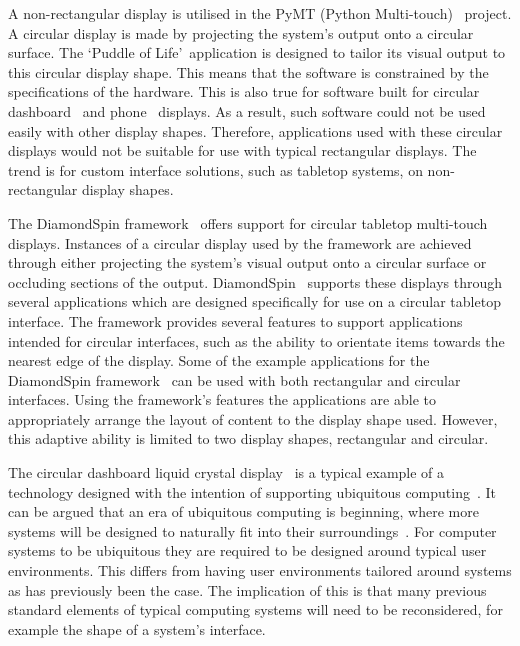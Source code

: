 \documentclass[review,5p,times,twocolumn]{elsarticle}
\begin{document}
A non-rectangular display is utilised in the PyMT (Python Multi-touch)~\cite{Hansen2009} project.
A circular display is made by projecting the system's output onto a circular surface.
The \lq Puddle of Life\rq\ application is designed to tailor its visual output to this circular display shape.
This means that the software is constrained by the specifications of the hardware.
This is also true for software built for circular dashboard~\cite{Boyd2007} and phone~\cite{Finney2009} displays.
As a result, such software could not be used easily with other display shapes.
Therefore, applications used with these circular displays would not be suitable for use with typical rectangular displays.
The trend is for custom interface solutions, such as tabletop systems, on non-rectangular display shapes.

The DiamondSpin framework~\cite{Shen2004} offers support for circular tabletop multi-touch displays.
Instances of a circular display used by the framework are achieved through either projecting the system's visual output onto a circular surface or occluding sections of the output.
DiamondSpin~\cite{Shen2004} supports these displays through several applications which are designed specifically for use on a circular tabletop interface.
The framework provides several features to support applications intended for circular interfaces, such as the ability to orientate items towards the nearest edge of the display.
Some of the example applications for the DiamondSpin framework~\cite{Shen2004} can be used with both rectangular and circular interfaces.
Using the framework's features the applications are able to appropriately arrange the layout of content to the display shape used.
However, this adaptive ability is limited to two display shapes, rectangular and circular.

The circular dashboard liquid crystal display~\cite{Boyd2007} is a typical example of a technology designed with the intention of supporting ubiquitous computing~\cite{Weiser1999}.
It can be argued that an era of ubiquitous computing is beginning, where more systems will be designed to naturally fit into their surroundings~\cite{Greenfield2006}.
For computer systems to be ubiquitous they are required to be designed around typical user environments.
This differs from having user environments tailored around systems as has previously been the case.
The implication of this is that many previous standard elements of typical computing systems will need to be reconsidered, for example the shape of a system's interface.
\end{document}
